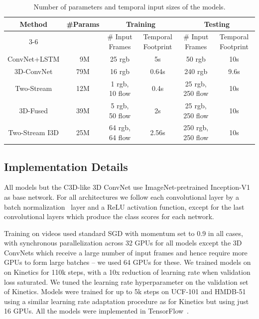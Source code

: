 \documentclass[10pt,twocolumn,letterpaper]{article}
\begin{document}
\begin{table}[ht]
\centering
\begin{tabular}{| c | c | c | c | c | c| }
  \hline
  
  \multirow{2}{*}{\parbox{1.5cm}{Method}} & \multirow{2}{*}{\parbox{1.5cm}{\#Params}} &
  \multicolumn{2}{|c|}{Training} &
  \multicolumn{2}{|c|}{Testing} \\ \cline{3-6}

   & & \# Input Frames & Temporal Footprint & \# Input Frames & Temporal Footprint  \\ \hline \hline
   
ConvNet+LSTM & ~9M & 25 rgb  &  5s &  50 rgb  & 10s \\ \hline
3D-ConvNet & 79M & 16 rgb & 0.64s & 240 rgb & 9.6s \\ \hline
Two-Stream  & 12M & 1 rgb, 10 flow  & 0.4s  & 25 rgb, 250 flow & 10s \\ \hline
3D-Fused & 39M & 5 rgb, 50 flow   & 2s & 25 rgb, 250 flow & 10s \\ \hline
Two-Stream I3D & 25M & 64 rgb, 64 flow & 2.56s & 250 rgb, 250 flow & 10s \\ \hline
\end{tabular} 
\vspace{5pt}
\caption{Number of parameters and temporal input sizes of the models.}
\label{tab:temporal_interfaces}
\end{table}



\subsection{Implementation Details}


All models but the C3D-like 3D ConvNet use ImageNet-pretrained Inception-V1~\cite{ioffe2015batch} as base network. For all architectures we follow each convolutional layer by a batch
normalization~\cite{ioffe2015batch} layer and a ReLU activation
function, except for the last convolutional layers which produce the
class scores for each network.




Training on videos
used standard SGD with momentum set to 0.9 in all cases, with synchronous
parallelization across 32 GPUs for all models except the 3D ConvNets
which receive a large number of input frames and hence require more
GPUs to form large batches -- we used 64 GPUs for these. We trained
models on on Kinetics for 110k steps, with a 10x reduction of
learning rate when validation loss saturated. We tuned the learning rate hyperparameter on the validation set of
Kinetics. Models were trained for up to 5k steps on UCF-101 and HMDB-51 using a similar learning rate adaptation procedure as for Kinetics but using just 16 GPUs. All the models were implemented in 
TensorFlow~\cite{abadi2016tensorflow}.
\end{document}
